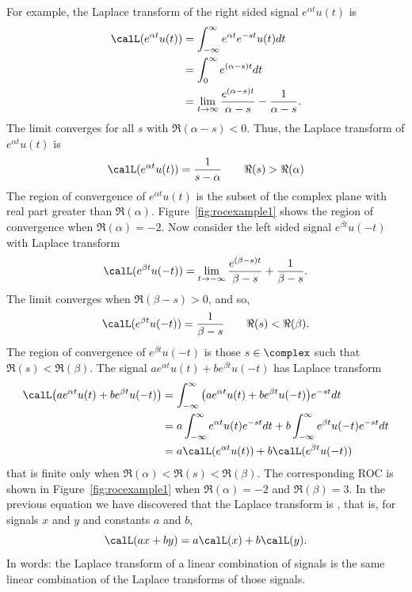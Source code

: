 For example, the Laplace transform of the right sided signal $e^{ \alpha t}u(t)$ is
\begin{align*}
\calL(e^{ \alpha t}u(t)) &= \int_{-\infty}^{\infty} e^{ \alpha t} e^{-st} u(t) dt \\
&= \int_{0}^{\infty} e^{(\alpha - s)t} dt \\
&= \lim_{t\rightarrow\infty}\frac{e^{(\alpha-s)t}}{\alpha - s} - \frac{1}{\alpha-s}.
\end{align*}
The limit converges for all $s$ with $\Re(\alpha - s) <0$.  Thus, the Laplace transform of $e^{\alpha t}u(t)$ is
\[
\calL(e^{ \alpha t}u(t)) = \frac{1}{s-\alpha} \qquad \Re(s) > \Re(\alpha)
\]
The region of convergence of $e^{\alpha t}u(t)$ is the subset of the complex plane with real part greater than $\Re(\alpha)$.  Figure~\ref{fig:rocexample1} shows the region of convergence when $\Re(\alpha) = -2$.  Now consider the left sided signal $e^{\beta t}u(-t)$ with Laplace transform
\[
\calL(e^{\beta t}u(-t)) = \lim_{t\rightarrow -\infty}\frac{e^{(\beta-s)t}}{\beta - s} + \frac{1}{\beta-s}.
\]
The limit converges when $\Re(\beta - s) > 0$, and so,
\[
\calL(e^{\beta t}u(-t)) = \frac{1}{\beta-s} \qquad \Re(s) < \Re(\beta).
\]
The region of convergence of $e^{\beta t}u(-t)$ is those $s \in \complex$ such that $\Re(s) < \Re(\beta)$.  The signal $a e^{ \alpha t}u(t) + b e^{\beta t}u(-t)$ has Laplace transform
\begin{align*}
\calL\big( a e^{ \alpha t}u(t) + b e^{\beta t}u(-t) \big) &= \int_{-\infty}^{\infty} \big( a e^{ \alpha t}u(t) + b e^{\beta t}u(-t) \big) e^{-st} dt \\
&= a \int_{-\infty}^{\infty} e^{ \alpha t}u(t) e^{-st} dt + b\int_{-\infty}^{\infty} e^{\beta t}u(-t)  e^{-st} dt \\
&= a \calL(e^{ \alpha t}u(t)) + b\calL(e^{\beta t}u(-t))
\end{align*}
that is finite only when $\Re(\alpha) < \Re(s) < \Re(\beta)$.  The corresponding ROC is shown in Figure~\ref{fig:rocexample1} when $\Re(\alpha) = -2$ and $\Re(\beta)=3$.   In the previous equation we have discovered that the Laplace transform is , that is, for signals $x$ and $y$ and constants $a$ and $b$,
\begin{equation}\label{eq:laplacetransislinear}
\calL(ax + by) = a\calL(x) + b\calL(y).
\end{equation}
In words: the Laplace transform of a linear combination of signals is the same linear combination of the Laplace transforms of those signals.

